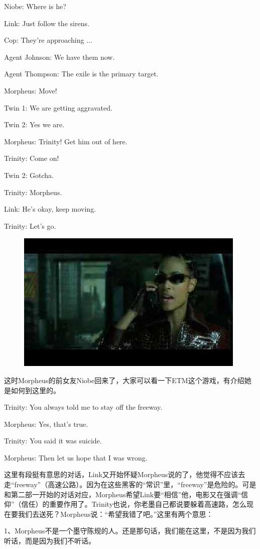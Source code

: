 \documentclass{ctexart}
\newenvironment{myquote}{\color{green} \setlength{\leftskip}{6em} \setlength{\rightskip}{4em} \setlength{\parindent}{-2em}}{\par}
\begin{document}
\begin{myquote}
Niobe: Where is he?

Link: Just follow the sirens.

Cop: They're approaching ...

Agent Johnson: We have them now.

Agent Thompson: The exile is the primary target.

Morpheus: Move!

Twin 1: We are getting aggravated.

Twin 2: Yes we are.

Morpheus: Trinity! Get him out of here.

Trinity: Come on!

Twin 2: Gotcha.

Trinity: Morpheus.

Link: He's okay, keep moving.

Trinity: Let's go.
\end{myquote}

\begin{figure}[htb]
\centering
\includegraphics[width=0.5\linewidth]{fig/read_reloaded-130}
\end{figure}

这时Morpheus的前女友Niobe回来了，大家可以看一下ETM这个游戏，有介绍她是如何到这里的。

Trinity: You always told me to stay off the freeway.

Morpheus: Yes, that's true.

Trinity: You said it was suicide.

Morpheus: Then let us hope that I was wrong.

这里有段挺有意思的对话，Link又开始怀疑Morpheus说的了，他觉得不应该去走“freeway”（高速公路）。因为在这些黑客的“常识”里，“freeway”是危险的。可是和第二部一开始的对话对应，Morpheus希望Link要“相信”他，电影又在强调“信仰”（信任）的重要作用了。Trinity也说，你老墨自己都说要躲着高速路，怎么现在要我们去送死？Morpheus说：“希望我错了吧。”这里有两个意思：

1、Morpheus不是一个墨守陈规的人。还是那句话，我们能在这里，不是因为我们听话，而是因为我们不听话。
\end{document}
